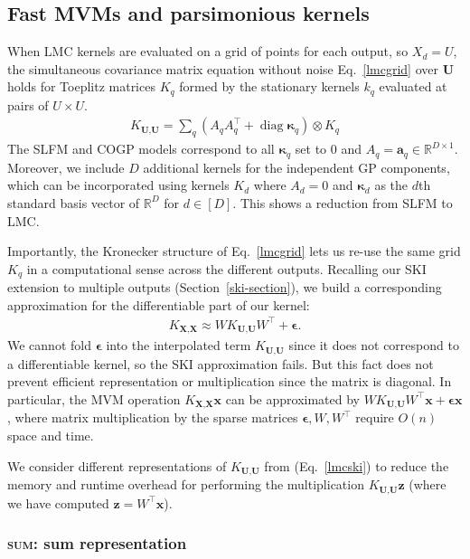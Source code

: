 \documentclass{article}
\def\bse{{\boldsymbol\epsilon}}
\def\bsk{{\boldsymbol\kappa}}
\def \R {\mathbb{R}}
\def\Tx{\textbf{x}}
\def\TX{\textbf{X}}
\def\TU{\textbf{U}}
\def\Tz{\textbf{z}}
\DeclareMathOperator{\diag}{diag}
\begin{document}
\subsection{Fast MVMs and parsimonious kernels}\label{fast-mvm}

When LMC kernels are evaluated on a grid of points for each output, so $X_d=U$, the simultaneous covariance matrix equation without noise Eq.~\ref{lmcgrid} over $\TU$ holds for Toeplitz matrices $K_q$ formed by the stationary kernels $k_q$ evaluated at pairs of $U\times U$.
\begin{align}
  K_{\TU,\TU}=\sum_q(A_qA_q^\top+\diag\bsk_q)\otimes K_q\label{lmcgrid}
\end{align}
The SLFM and COGP models correspond to all $\bsk_q$ set to 0 and $A_q=\textbf{a}_q\in\R^{D\times 1}$. Moreover, we include $D$ additional kernels for the independent GP components, which can be incorporated using kernels $K_d$ where $A_d=0$ and $\bsk_d$ as the $d$th standard basis vector of $\R^D$ for $d\in[D]$. This shows a reduction from SLFM to LMC.

Importantly, the Kronecker structure of Eq.~\ref{lmcgrid} lets us re-use the same grid $K_q$ in a computational sense across the different outputs. Recalling our SKI extension to multiple outputs (Section~\ref{ski-section}), we build a corresponding approximation for the differentiable part of our kernel:
\begin{align}
  K_{\TX,\TX}\approx WK_{\TU,\TU}W^\top+\bse.\label{lmcski}
\end{align}
We cannot fold $\bse$ into the interpolated term $K_{\TU,\TU}$ since it does not correspond to a differentiable kernel, so the SKI approximation fails. But this fact does not prevent efficient representation or multiplication since the matrix is diagonal. In particular, the MVM operation $K_{\TX,\TX}\Tx$ can be approximated by $WK_{\TU,\TU}W^\top\Tx+\bse\Tx$, where matrix multiplication by the sparse matrices $\bse, W,W^\top$ require $O(n)$ space and time.

We consider different representations of $K_{\TU,\TU}$ from (Eq.~\ref{lmcski}) to reduce the memory and runtime overhead for performing the multiplication $K_{\TU,\TU}\Tz$ (where we have computed $\Tz=W^\top\Tx$).


\subsubsection{\textsc{sum}: sum representation}
\end{document}
